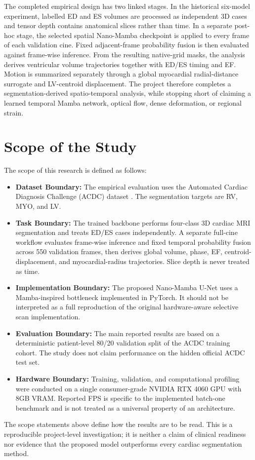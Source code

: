 The completed empirical design has two linked stages. In the historical six-model experiment, labelled ED and ES volumes are processed as independent 3D cases and tensor depth contains anatomical slices rather than time. In a separate post-hoc stage, the selected spatial Nano-Mamba checkpoint is applied to every frame of each validation cine. Fixed adjacent-frame probability fusion is then evaluated against frame-wise inference. From the resulting native-grid masks, the analysis derives ventricular volume trajectories together with ED/ES timing and EF. Motion is summarized separately through a global myocardial radial-distance surrogate and LV-centroid displacement. The project therefore completes a segmentation-derived spatio-temporal analysis, while stopping short of claiming a learned temporal Mamba network, optical flow, dense deformation, or regional strain.

\section{Scope of the Study}
The scope of this research is defined as follows:
\begin{itemize}
    \item \textbf{Dataset Boundary:} The empirical evaluation uses the Automated Cardiac Diagnosis Challenge (ACDC) dataset \citep{bernard2018deep}. The segmentation targets are RV, MYO, and LV.
    \item \textbf{Task Boundary:} The trained backbone performs four-class 3D cardiac MRI segmentation and treats ED/ES cases independently. A separate full-cine workflow evaluates frame-wise inference and fixed temporal probability fusion across 550 validation frames, then derives global volume, phase, EF, centroid-displacement, and myocardial-radius trajectories. Slice depth is never treated as time.
    \item \textbf{Implementation Boundary:} The proposed Nano-Mamba U-Net uses a Mamba-inspired bottleneck implemented in PyTorch. It should not be interpreted as a full reproduction of the original hardware-aware selective scan implementation.
    \item \textbf{Evaluation Boundary:} The main reported results are based on a deterministic patient-level 80/20 validation split of the ACDC training cohort. The study does not claim performance on the hidden official ACDC test set.
    \item \textbf{Hardware Boundary:} Training, validation, and computational profiling were conducted on a single consumer-grade NVIDIA RTX 4060 GPU with 8GB VRAM. Reported FPS is specific to the implemented batch-one benchmark and is not treated as a universal property of an architecture.
\end{itemize}
The scope statements above define how the results are to be read. This is a reproducible project-level investigation; it is neither a claim of clinical readiness nor evidence that the proposed model outperforms every cardiac segmentation method.

